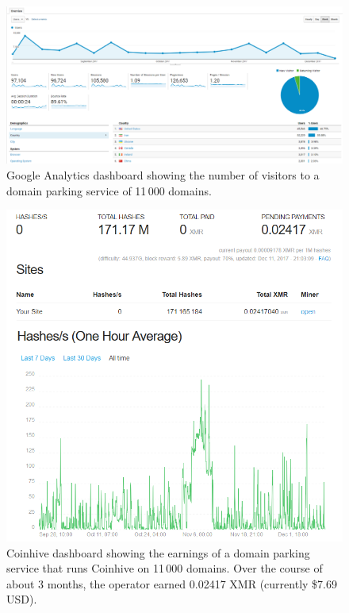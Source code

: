 \begin{figure}[t]
\centering
\includegraphics[width=\linewidth]{figures/experiment_analytics_results.png}
\caption{Google Analytics dashboard showing the number of visitors to a domain parking service of 11\,000 domains.}\label{fig:domain2}
\end{figure}

\begin{figure}[t]
\centering
\includegraphics[width=\linewidth]{figures/experiment_coinhive_results.png}
\caption{Coinhive dashboard showing the earnings of a domain parking service that runs Coinhive on 11\,000 domains. Over the course of about 3 months, the operator earned 0.02417 XMR (currently \$7.69 USD).}\label{fig:domain1}
\end{figure}

